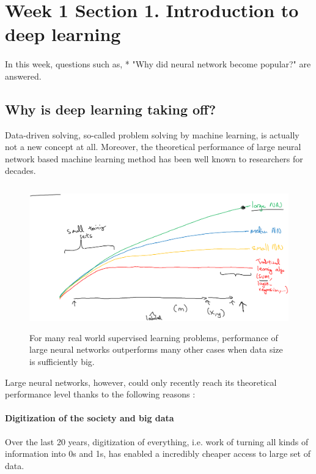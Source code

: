\usepackage{float}

\section{Week 1 Section 1. Introduction to deep learning} 

\paragraph{}
In this week, questions such as,\newline
* "Why did neural network become popular?"\newline
are answered.

\subsection{Why is deep learning taking off?} Data-driven solving, so-called problem solving by machine learning, is actually not a new concept at all. Moreover, the theoretical performance of large neural network based machine learning method has been well known to researchers for decades. 
\begin{figure}[H]
\centering
\includegraphics[height=6.2cm]{c1w1_pic1.png}
\caption{For many real world supervised learning problems, performance of large neural networks outperforms many other cases when data size is sufficiently big.}
\end{figure}

Large neural networks, however, could only recently reach its theoretical performance level thanks to the following reasons : 

\paragraph{Digitization of the society and big data} Over the last 20 years, digitization of everything, i.e. work of turning all kinds of information into 0s and 1s, has enabled a incredibly cheaper access to large set of data. 

